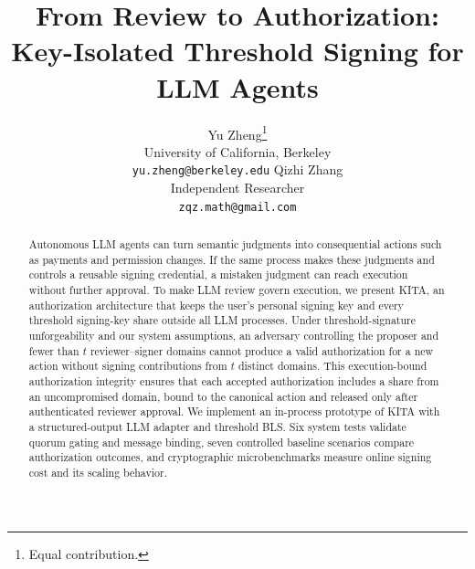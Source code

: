 \documentclass{article}
\title{From Review to Authorization: Key-Isolated Threshold Signing for LLM Agents}
\author{
  Yu Zheng\thanks{Equal contribution.} \\
  University of California, Berkeley \\
  \texttt{yu.zheng@berkeley.edu}
  \And
  Qizhi Zhang\footnotemark[1] \\
  Independent Researcher \\
  \texttt{zqz.math@gmail.com}
}
\begin{document}
\raggedbottom
\maketitle

\begin{abstract}
Autonomous LLM agents can turn semantic judgments into consequential actions
such as payments and permission changes. If the same process makes these
judgments and controls a reusable signing credential, a mistaken judgment
can reach execution without further approval. To make LLM review
govern execution, we present \textsf{KITA}, an authorization architecture
that keeps the user's personal signing key and every threshold signing-key
share outside all LLM processes. Under threshold-signature unforgeability
and our system assumptions, an adversary controlling the proposer and fewer
than $t$ reviewer--signer domains cannot produce a valid authorization for
a new action without signing contributions from $t$ distinct domains. This execution-bound authorization
integrity ensures that each accepted authorization includes a share from an
uncompromised domain, bound to the canonical action and released only after
authenticated reviewer approval.
We implement an in-process prototype of \textsf{KITA} with a structured-output
LLM adapter and threshold BLS. Six system tests validate quorum gating and
message binding, seven controlled baseline scenarios compare authorization
outcomes, and cryptographic microbenchmarks measure online signing cost and
its scaling behavior.

\end{abstract}
\end{document}
